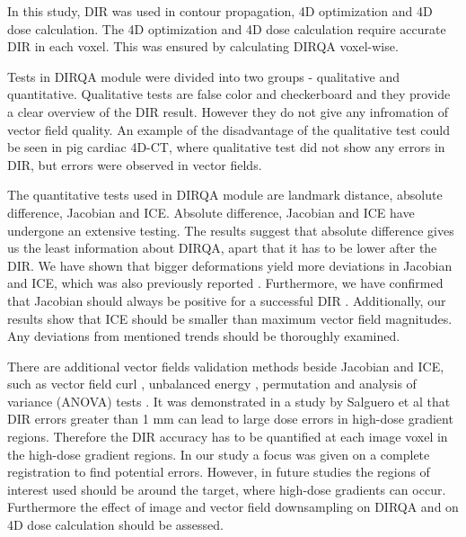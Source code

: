 In this study, DIR was used in contour propagation, 4D optimization and 4D dose calculation. The 4D optimization and 4D dose calculation require 
accurate DIR in each voxel. This was ensured by calculating DIRQA voxel-wise. 

Tests in DIRQA module were divided into two groups - qualitative and quantitative. Qualitative tests are false color and checkerboard and they provide a clear overview of the DIR result.
However they do not give any infromation of vector field quality. An example of the disadvantage of the qualitative test could be seen in pig cardiac 4D-CT, where qualitative test did not show
any errors in DIR, but errors were observed in vector fields. 

The quantitative tests used in DIRQA module are landmark distance, absolute difference, Jacobian and ICE. Absolute difference, Jacobian and ICE have undergone an extensive testing. The results suggest
that absolute difference gives us the least information about DIRQA, apart that it has to be lower after the DIR. 
We have shown that bigger deformations yield more deviations in Jacobian and ICE, which was also previously reported \cite{Stanley2013}. 
Furthermore, we have confirmed that Jacobian should always be positive for a successful DIR \cite{Rey2002}. Additionally, our results show that ICE should 
be smaller than maximum vector field magnitudes. Any deviations from mentioned trends should be thoroughly examined.

There are additional vector fields validation methods beside Jacobian and ICE, such as vector field curl \cite{Schreibmann2012}, unbalanced energy \cite{Zhong2007}, 
permutation and analysis of variance (ANOVA) tests \cite{Klein2009}.
It was demonstrated in a study by Salguero et al \cite{Salguero2011} that DIR errors greater than 1 mm can lead to large dose errors in high-dose gradient regions. 
Therefore the DIR accuracy has to be quantified at each image voxel in the high-dose 
gradient regions. In our study a focus was given on a complete registration to find potential errors. However, in future studies the regions of interest used
should be around the target, where high-dose gradients can occur. Furthermore the effect of image and vector field downsampling on DIRQA and on 4D dose calculation should be assessed.

